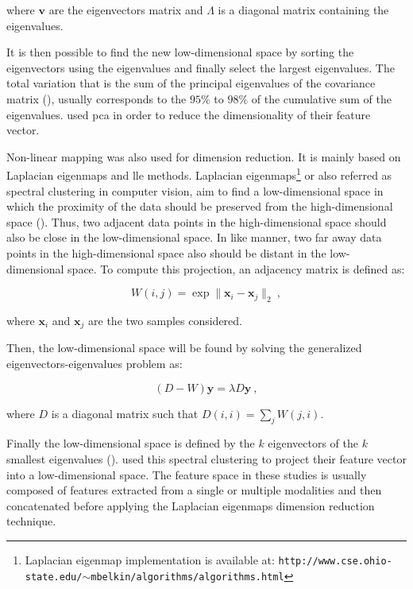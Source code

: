 \noindent where $\mathbf{v}$ are the eigenvectors matrix and $\Lambda$ is a diagonal matrix containing the eigenvalues. 

It is then possible to find the new low-dimensional space by sorting the eigenvectors using the eigenvalues and finally select the largest eigenvalues. The total variation that is the sum of the principal eigenvalues of the covariance matrix (\cite{Fodor2002}), usually corresponds to the $95\%$ to $98\%$ of the cumulative sum of the eigenvalues. \cite{Tiwari2008,Tiwari2009,Tiwari2012} used \ac{pca} in order to reduce the dimensionality of their feature vector.

Non-linear mapping was also used for dimension reduction. It is mainly based on Laplacian eigenmaps and \acf{lle} methods. Laplacian eigenmaps\footnote{Laplacian eigenmap implementation is available at: \texttt{http://www.cse.\allowbreak ohio-state.edu/$\sim$mbelkin/algorithms/algorithms.html}} or also referred as spectral clustering in computer vision, aim to find a low-dimensional space in which the proximity of the data should be preserved from the high-dimensional space (\cite{Shi2000,Belkin2001}). Thus, two adjacent data points in the high-dimensional space should also be close in the low-dimensional space. In like manner, two far away data points in the high-dimensional space also should be distant in the low-dimensional space. To compute this projection, an adjacency matrix is defined as:

\begin{equation}
	W(i,j) = \exp \| \mathbf{x}_i - \mathbf{x}_j \|_2 \ ,
	\label{eq:gew}
\end{equation}

\noindent where $\mathbf{x}_i$ and $\mathbf{x}_j$ are the two samples considered.

Then, the low-dimensional space will be found by solving the generalized eigenvectors-eigenvalues problem as:

\begin{equation}
	(D-W)\mathbf{y} = \lambda D \mathbf{y} \ ,
	\label{eq:geeig}
\end{equation}

\noindent where $D$ is a diagonal matrix such that $D(i,i) = \sum_j W(j,i)$.

Finally the low-dimensional space is defined by the $k$ eigenvectors of the $k$ smallest eigenvalues (\cite{Belkin2001}). \cite{Tiwari2007,Tiwari2009,Tiwari2009a,Viswanath2008} used this spectral clustering to project their feature vector into a low-dimensional space. The feature space in these studies is usually composed of features extracted from a single or multiple modalities and then concatenated before applying the Laplacian eigenmaps dimension reduction technique.

